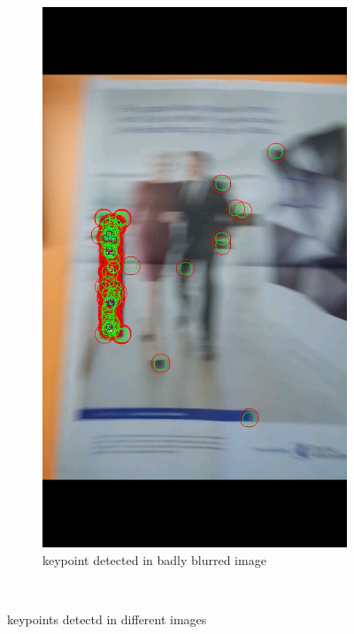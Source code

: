 \documentclass[10pt,conference,compsocconf]{IEEEtran}
\begin{document}
\begin{figure}[!ht]
        \begin{subfigure}[b]{0.2\textwidth}
                \includegraphics[width=\textwidth]{badly1}
                \caption{keypoint detected in badly blurred image}
                \label{fig:badly1}
        \end{subfigure}
        ~ %
        \caption{keypoints detectd in different images}\label{fig:images}
\end{figure}
\end{document}
